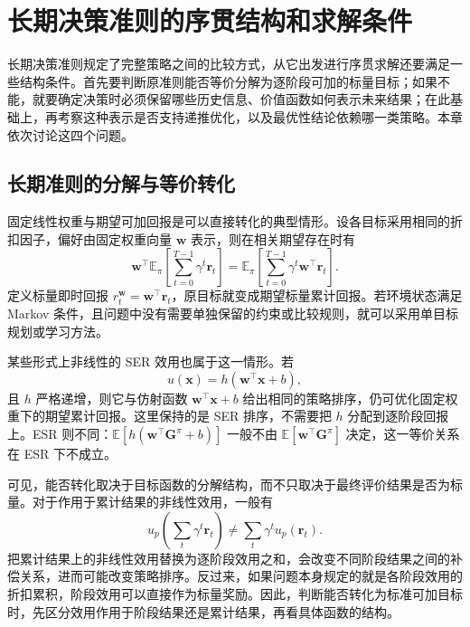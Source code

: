 \section{长期决策准则的序贯结构和求解条件}\label{sec:structure}

长期决策准则规定了完整策略之间的比较方式，从它出发进行序贯求解还要满足一些结构条件。首先要判断原准则能否等价分解为逐阶段可加的标量目标；如果不能，就要确定决策时必须保留哪些历史信息、价值函数如何表示未来结果；在此基础上，再考察这种表示是否支持递推优化，以及最优性结论依赖哪一类策略。本章依次讨论这四个问题。

\subsection{长期准则的分解与等价转化}\label{sec:structure-decomp}

固定线性权重与期望可加回报是可以直接转化的典型情形。设各目标采用相同的折扣因子，偏好由固定权重向量 \(\mathbf w\) 表示，则在相关期望存在时有
\begin{equation}
\mathbf w^\top
\mathbb E_\pi\!\left[
\sum_{t=0}^{T-1}\gamma^t\mathbf r_t
\right]
=
\mathbb E_\pi\!\left[
\sum_{t=0}^{T-1}\gamma^t
\mathbf w^\top\mathbf r_t
\right].
\end{equation}
定义标量即时回报 $r_t^{\mathbf w}=\mathbf w^\top\mathbf r_t$，原目标就变成期望标量累计回报。若环境状态满足 Markov 条件，且问题中没有需要单独保留的约束或比较规则，就可以采用单目标规划或学习方法\cite{hayes2022}。

某些形式上非线性的 SER 效用也属于这一情形。若
\begin{equation}
u(\mathbf x)=h(\mathbf w^\top\mathbf x+b),
\end{equation}
且 $h$ 严格递增，则它与仿射函数 $\mathbf w^\top\mathbf x+b$ 给出相同的策略排序，仍可优化固定权重下的期望累计回报\cite{rodriguezsoto2026utility}。这里保持的是 SER 排序，不需要把 $h$ 分配到逐阶段回报上。ESR 则不同：$\mathbb E[h(\mathbf w^\top\mathbf G^\pi+b)]$ 一般不由 $\mathbb E[\mathbf w^\top\mathbf G^\pi]$ 决定，这一等价关系在 ESR 下不成立。

可见，能否转化取决于目标函数的分解结构，而不只取决于最终评价结果是否为标量。对于作用于累计结果的非线性效用，一般有
\begin{equation}
u_p\!\left(
\sum_t\gamma^t\mathbf r_t
\right)
\neq
\sum_t\gamma^t u_p(\mathbf r_t).
\end{equation}
把累计结果上的非线性效用替换为逐阶段效用之和，会改变不同阶段结果之间的补偿关系，进而可能改变策略排序。反过来，如果问题本身规定的就是各阶段效用的折扣累积，阶段效用可以直接作为标量奖励。因此，判断能否转化为标准可加目标时，先区分效用作用于阶段结果还是累计结果，再看具体函数的结构。


